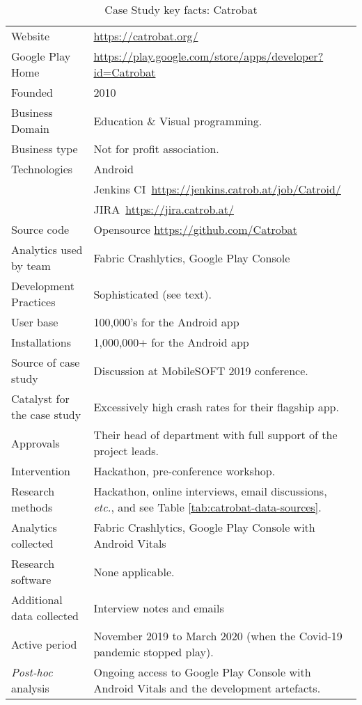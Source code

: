 {\renewcommand{\arraystretch}{0.8}%
\begin{table*}
    \centering
    \small
    \setlength{\tabcolsep}{6pt}
    \begin{tabular}{lp{11cm}}
       \toprule
       Website &\url{https://catrobat.org/} \\
       Google Play Home & \url{https://play.google.com/store/apps/developer?id=Catrobat} \\
       Founded & 2010 \\
       Business Domain & Education \& Visual programming. \\
       Business type & Not for profit association. \\
       Technologies  & Android \\
       & Jenkins CI~\url{https://jenkins.catrob.at/job/Catroid/}  \\
       & JIRA~\url{https://jira.catrob.at/} \\
       Source code  & Opensource \url{https://github.com/Catrobat} \\
       Analytics used by team & Fabric Crashlytics, Google Play Console \\
       Development Practices & Sophisticated (see text). \\
       \midrule
       User base & 100,000's for the Android app \\
       Installations & 1,000,000+ for the Android app \\
       \midrule
       Source of case study &Discussion at MobileSOFT 2019 conference. \\
       Catalyst for the case study &Excessively high crash rates for their flagship app. \\
       Approvals &Their head of department with full support of the project leads. \\
       \midrule
       Intervention &Hackathon, pre-conference workshop. \\
       Research methods &Hackathon, online interviews, email discussions, \emph{etc.}, and see Table \ref{tab:catrobat-data-sources}. \\
       Analytics collected &Fabric Crashlytics, Google Play Console with Android Vitals \\
       Research software & None applicable. \\
       Additional data collected &Interview notes and emails \\
       Active period & November 2019 to March 2020 (when the Covid-19 pandemic stopped play). \\
       \midrule
       \emph{Post-hoc} analysis & Ongoing access to Google Play Console with Android Vitals and the development artefacts. \\
       \bottomrule
    \end{tabular}
    \caption{Case Study key facts: Catrobat}
    \label{tab:catrobat_case_study_anaytics_overview}
\end{table*}
}

